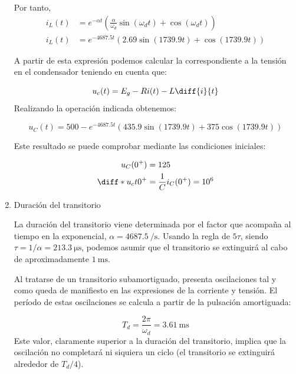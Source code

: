 \documentclass[12pt]{article}
\begin{document}
\begin{enumerate}
  Por tanto,
  \begin{align*}
        i_L(t) &= e^{-\alpha t} \left(\frac{\alpha}{\omega_d} \sin(\omega_d t) + \cos(\omega_d t)\right)\\
        i_L(t) &= e^{-4687.5 t} \left(2.69 \sin(1739.9t) + \cos(1739.9 t)\right)
  \end{align*}

  A partir de esta expresión podemos calcular la correspondiente a la tensión en el condensador teniendo en cuenta que:

  \[
    u_c(t) = E_g - R i(t) - L \diff{i}{t}
  \]
  Realizando la operación indicada obtenemos:

  \[
    u_C(t) = 500 - e^{-4687.5 t} \left(435.9 \sin(1739.9t) + 375 \cos(1739.9 t)\right)
  \]


  Este resultado se puede comprobar mediante las condiciones iniciales:

    \begin{align*}
    u_C(0^+) &= 125\\
    \diff*{u_c}{t}{0^+} &= \frac{1}{C}i_C(0^+) = 10^6\\
  \end{align*}

\item Duración del transitorio
  
  La duración del transitorio viene determinada por el factor que acompaña al tiempo en la exponencial, $\alpha = \SI{4687.5}{\per\second}$. Usando la regla de $5 \tau$, siendo $\tau = 1/\alpha = \SI{213.3}{\micro\second}$, podemos asumir que el transitorio se extinguirá al cabo de aproximadamente $\SI{1}{\milli\second}$.

  Al tratarse de un transitorio subamortiguado, presenta oscilaciones tal y como queda de manifiesto en las expresiones de la corriente y tensión. El período de estas oscilaciones se calcula a partir de la pulsación amortiguada:

  \[
    T_d = \frac{2\pi}{\omega_d} = \SI{3.61}{\milli\second} 
  \]
  Este valor, claramente superior a la duración del transitorio, implica que la oscilación no completará ni siquiera un ciclo (el transitorio se extinguirá alrededor de $T_d/4$).

\end{enumerate}
\end{document}
